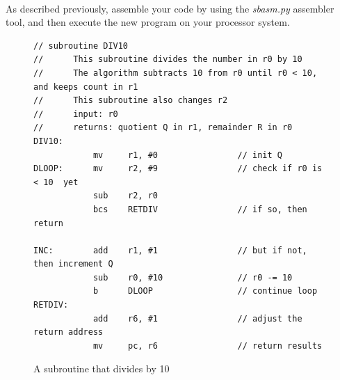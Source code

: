 \documentclass[epsfig,10pt,fullpage]{article} \addtolength{\textwidth}{1.5in}
\begin{document}
~\\
\noindent
As described previously, assemble your code by using the {\it sbasm.py} assembler tool, 
and then execute the new program on your processor system.

\lstset{language=ASM,numbers=none,escapechar=|}
\begin{figure}[H]
\begin{center}
\begin{minipage}[h]{15 cm}
\begin{lstlisting}[name=proc]
// subroutine DIV10
//      This subroutine divides the number in r0 by 10
//      The algorithm subtracts 10 from r0 until r0 < 10, and keeps count in r1
//      This subroutine also changes r2
//      input: r0
//      returns: quotient Q in r1, remainder R in r0
DIV10:
            mv     r1, #0                // init Q
DLOOP:      mv     r2, #9                // check if r0 is < 10  yet
            sub    r2, r0
            bcs    RETDIV                // if so, then return

INC:        add    r1, #1                // but if not, then increment Q
            sub    r0, #10               // r0 -= 10
            b      DLOOP                 // continue loop
RETDIV:
            add    r6, #1                // adjust the return address
            mv     pc, r6                // return results
\end{lstlisting}
\end{minipage}
\caption{A subroutine that divides by 10}
\label{fig:div10}
\end{center}
\end{figure}
\end{document}

